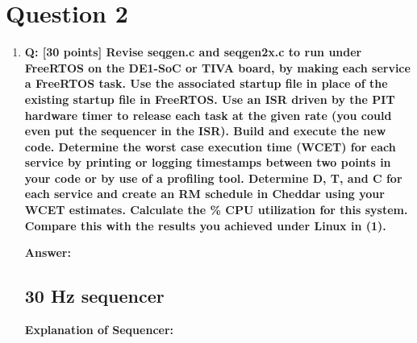 \documentclass[a4paper,11pt]{article}%
\newenvironment{qanda}{\setlength{\parindent}{0pt}}{\bigskip}
\newcommand{\Q}{\bigskip\bfseries Q: }
\newcommand{\A}{\par\textbf{Answer: } \normalfont}
\begin{document}
\begin{qanda}
\begin{enumerate}
	\end{enumerate}




	\section{Question 2}
	\begin{enumerate}
		\item[] \Q [30 points] Revise seqgen.c and seqgen2x.c to run under FreeRTOS on the DE1-SoC or
			TIVA board, by making each service a FreeRTOS task. Use the associated startup file in
			place of the existing startup file in FreeRTOS. Use an ISR driven by the PIT hardware timer
			to release each task at the given rate (you could even put the sequencer in the ISR). Build
			and execute the new code. Determine the worst case execution time (WCET) for each
			service by printing or logging timestamps between two points in your code or by use of a
			profiling tool. Determine D, T, and C for each service and create an RM schedule in
			Cheddar using your WCET estimates. Calculate the \% CPU utilization for this system.
			Compare this with the results you achieved under Linux in (1).
			\A
			\subsection{30 Hz sequencer}
			\textbf{Explanation of Sequencer:}


\end{enumerate}
\end{qanda}
\end{document}
